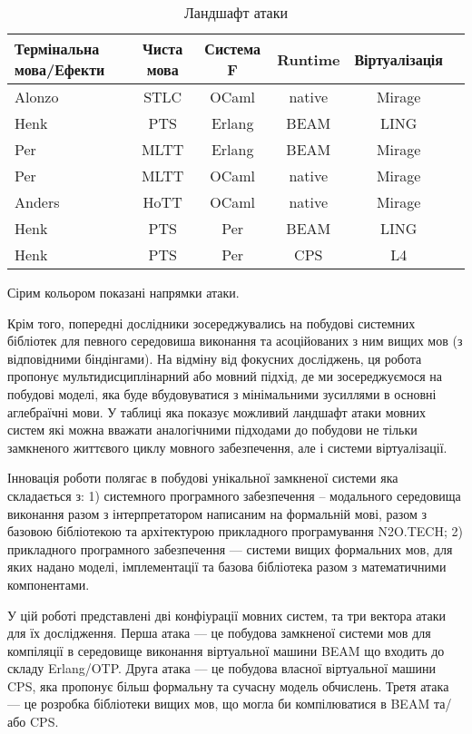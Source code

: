 \begin{table}
 \caption{Ландшафт атаки}
  \begin{tabular}{lccccc}
    \hline
       \textbf{Термінальна мова/Ефекти} & \textbf{Чиста мова} & \textbf{Система F} & \textbf{Runtime} & \textbf{Віртуалізація} \\
    \hline
 Alonzo            & STLC      & OCaml   & native & Mirage \\
 Henk              & PTS       & Erlang  & BEAM   & LING \\
 Per               & MLTT      & Erlang  & BEAM   & Mirage \\
 Per               & MLTT      & OCaml   & native & Mirage \\
 Anders            & HoTT      & OCaml   & native & Mirage \\
    \hline
    \rowcolor{LightGray}
 Henk              & PTS       & Per     & BEAM   & LING \\
    \rowcolor{LightGray}
 Henk              & PTS       & Per     & CPS    & L4 \\
    \hline
  \end{tabular}
  \small Сірим кольором показані напрямки атаки.
\end{table}

Крім того, попередні дослідники зосереджувались на побудові системних бібліотек для
певного середовиша виконання та асоційованих з ним вищих мов (з відповідними біндінгами).
На відміну від фокусних досліджень, ця робота пропонує мультидисциплінарний або мовний підхід,
де ми зосереджуємося на побудові моделі, яка буде вбудовуватися з мінімальними
зусиллями в основні аглебраїчні мови. У таблиці яка показує можливий ландшафт атаки
мовних систем які можна вважати аналогічними підходами до побудови не тільки замкненого
життєвого циклу мовного забезпечення, але і системи віртуалізації.

Інновація роботи полягає в побудові унікальної замкненої системи яка складається з:
1) системного програмного забезпечення -- модального середовища виконання разом з інтерпретатором
написаним на формальній мові, разом з базовою бібліотекою та архітектурою прикладного програмування N2O.TECH;
2) прикладного програмного забезпечення --- системи вищих формальних мов, для яких надано моделі,
імплементації та базова бібліотека разом з математичними компонентами.

У цій роботі представлені дві конфіурації мовних систем, та три вектора атаки для їх дослідження.
Перша атака --- це побудова замкненої системи мов для компіляції в середовище виконання віртуальної машини BEAM що входить до складу Erlang/OTP.
Друга атака --- це побудова власної віртуальної машини CPS, яка пропонує більш формальну та сучасну модель обчислень.
Третя атака --- це розробка бібліотеки вищих мов, що могла би компілюватися в BEAM та/або CPS. \\

